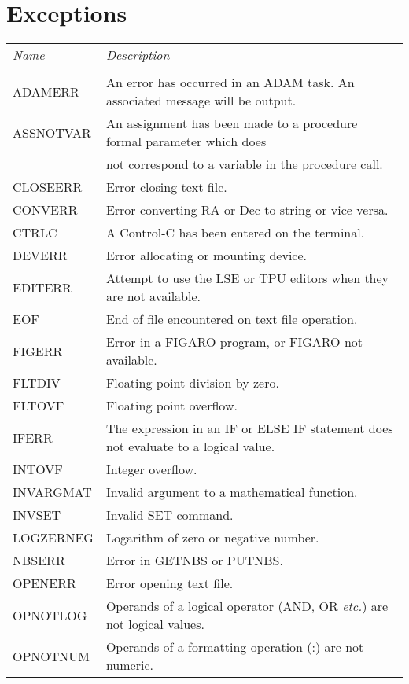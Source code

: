 \section{Exceptions}

\begin{center}
\begin{tabular}{ll}
{\em Name} & {\em Description} \\
\\
ADAMERR  &  An error has occurred in an ADAM task. An associated message will
   be output. \\
ASSNOTVAR  &  An assignment has been made to a procedure formal parameter
   which does \\
   & not correspond to a variable in the procedure call. \\
CLOSEERR  &  Error closing text file. \\
CONVERR  &  Error converting RA or Dec to string or vice versa. \\
CTRLC  &  A Control-C has been entered on the terminal.\\
DEVERR  &  Error allocating or mounting device.\\
EDITERR  &  Attempt to use the LSE or TPU editors when they are not available.\\
EOF & End of file encountered on text file operation. \\
FIGERR  &  Error in a FIGARO program, or FIGARO not available. \\
FLTDIV  &  Floating point division by zero. \\
FLTOVF  &  Floating point overflow. \\
IFERR  &  The expression in an IF or ELSE IF statement does not evaluate to a
  logical value. \\                              
INTOVF  &  Integer overflow. \\
INVARGMAT  &  Invalid argument to a mathematical function.  \\
INVSET  &  Invalid SET command.  \\
LOGZERNEG  &  Logarithm of zero or negative number.  \\
NBSERR  &  Error in GETNBS or PUTNBS. \\
OPENERR  &  Error opening text file. \\
OPNOTLOG  &  Operands of a logical operator (AND, OR {\em etc.}) are not
   logical values.  \\
OPNOTNUM  &  Operands of a formatting operation (:) are not numeric. \\

\end{tabular}
\end{center}
